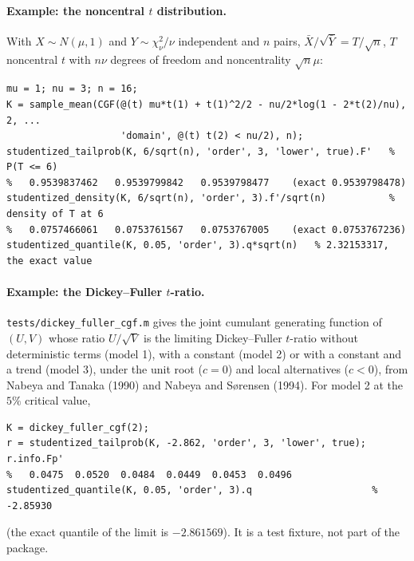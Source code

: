 \documentclass[11pt]{article}
\newcommand{\prog}[1]{\texttt{#1}}
\begin{document}
\paragraph{Example: the noncentral $t$ distribution.} With $X\sim N(\mu,1)$ and
$Y\sim\chi^2_\nu/\nu$ independent and $n$ pairs, $\bar X/\sqrt{\bar Y}=T/\sqrt n$, $T$ noncentral $t$
with $n\nu$ degrees of freedom and noncentrality $\sqrt n\mu$:
\begin{lstlisting}
mu = 1; nu = 3; n = 16;
K = sample_mean(CGF(@(t) mu*t(1) + t(1)^2/2 - nu/2*log(1 - 2*t(2)/nu), 2, ...
                    'domain', @(t) t(2) < nu/2), n);
studentized_tailprob(K, 6/sqrt(n), 'order', 3, 'lower', true).F'   % P(T <= 6)
%   0.9539837462   0.9539799842   0.9539798477    (exact 0.9539798478)
studentized_density(K, 6/sqrt(n), 'order', 3).f'/sqrt(n)           % density of T at 6
%   0.0757466061   0.0753761567   0.0753767005    (exact 0.0753767236)
studentized_quantile(K, 0.05, 'order', 3).q*sqrt(n)   % 2.32153317, the exact value
\end{lstlisting}

\paragraph{Example: the Dickey--Fuller $t$-ratio.} \prog{tests/dickey\_fuller\_cgf.m} gives the joint
cumulant generating function of $(U,V)$ whose ratio $U/\sqrt V$ is the limiting Dickey--Fuller
$t$-ratio without deterministic terms (model 1), with a constant (model 2) or with a constant and a
trend (model 3), under the unit root ($c=0$) and local alternatives ($c<0$), from Nabeya and Tanaka
(1990) and Nabeya and S{\o}rensen (1994). For model 2 at the $5\%$ critical value,
\begin{lstlisting}
K = dickey_fuller_cgf(2);
r = studentized_tailprob(K, -2.862, 'order', 3, 'lower', true);  r.info.Fp'
%   0.0475  0.0520  0.0484  0.0449  0.0453  0.0496
studentized_quantile(K, 0.05, 'order', 3).q                     % -2.85930
\end{lstlisting}
(the exact quantile of the limit is $-2.861569$). It is a test fixture, not part of the package.
\end{document}

